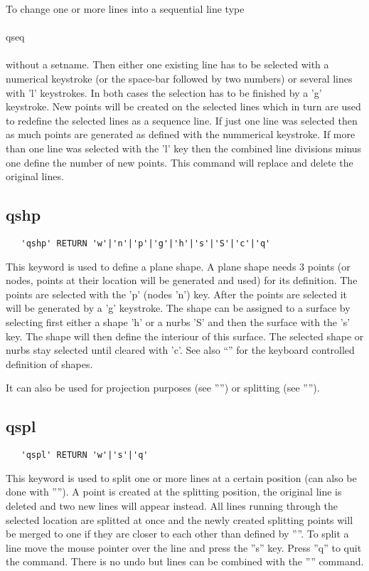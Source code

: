 \documentclass{article}
\begin{document}
To change one or more lines into a sequential line type\\\\qseq\\\\without a setname. Then either one existing line has to be selected with a numerical keystroke (or the space-bar followed by two numbers) or several lines with 'l' keystrokes. In both cases the selection has to be finished by a 'g' keystroke. New points will be created on the selected lines which in turn are used to redefine the selected lines as a sequence line. If just one line was selected then as much points are generated as defined with the nummerical keystroke. If more than one line was selected with the 'l' key then the combined line divisions minus one define the number of new points. This command will replace and delete the original lines.

\subsection{\label{qshp}qshp}
\begin{verbatim}
   'qshp' RETURN 'w'|'n'|'p'|'g'|'h'|'s'|'S'|'c'|'q'
\end{verbatim}
This keyword is used to define a plane shape. A plane shape needs 3 points (or nodes, points at their location will be generated and used) for its definition. The points are selected with the 'p' (nodes 'n') key. After the points are selected it will be generated by a 'g' keystroke. The shape can be assigned to a surface by selecting first either a shape 'h' or a nurbs 'S' and then the surface with the 's' key. The shape will then define the interiour of this surface. The selected shape or nurbs stay selected until cleared with 'c'. See also ``'' for the keyboard controlled definition of shapes.

It can also be used for projection purposes (see '''') or splitting (see '''').

\subsection{\label{qspl}qspl}
\begin{verbatim}
   'qspl' RETURN 'w'|'s'|'q' 
\end{verbatim}
This keyword is used to split one or more lines at a certain position (can also be done with ''''). A point is created at the splitting position, the original line is deleted and two new lines will appear instead. All lines running through the selected location are splitted at once and the newly created splitting points will be merged to one if they are closer to each other than defined by ''''. To split a line move the mouse pointer over the line and press the ''s'' key. Press ''q'' to quit the command. There is no undo but lines can be combined with the '''' command. 
\end{document}
